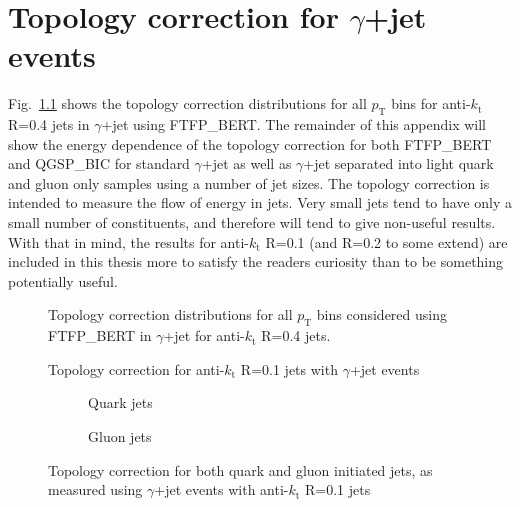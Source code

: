 \chapter{ Topology correction for $\gamma$+jet events}
Fig.~\ref{plot:GJetTopoCorrDists4App} shows the topology correction distributions for all $p_{\mathrm T}$ bins for anti-$k_{\mathrm t}$ R=0.4 jets in $\gamma$+jet using FTFP\_BERT.  
The remainder of this appendix will show the energy dependence of the topology correction for both FTFP\_BERT and QGSP\_BIC for standard $\gamma$+jet as well as $\gamma$+jet separated into light quark and gluon only samples using a number of jet sizes.  
The topology correction is intended to measure the flow of energy in jets.  
Very small jets tend to have only a small number of constituents, and therefore will tend to give non-useful results.  
With that in mind, the results for anti-$k_{\mathrm t}$ R=0.1 (and R=0.2 to some extend) are included in this thesis more to satisfy the readers curiosity than to be something potentially useful. 


\begin{figure}[!ht]
 \centering
 \caption[Topology correction distributions, anti-$k_{\mathrm t}$ R=0.4 with FTFP\_BERT]
 {\small Topology correction distributions for all $p_{\mathrm T}$ bins considered using FTFP\_BERT in $\gamma$+jet for anti-$k_{\mathrm t}$ R=0.4 jets.  } 
 \label{plot:GJetTopoCorrDists4App}
\end{figure}
\clearpage

\begin{figure}[!ht]
 \centering
 \caption[Topology correction for anti-$k_{\mathrm t}$ R=0.1 jets with $\gamma$+jet events]
 {\small Topology correction for anti-$k_{\mathrm t}$ R=0.1 jets with $\gamma$+jet events}
 \label{plot:GJetTopoCorr1App}
\end{figure}

\begin{figure}[!ht]
 \centering
 \begin{subfigure}{.5\textwidth}
  \centering
  \caption{Quark jets}
 \end{subfigure}%
 \begin{subfigure}{.5\textwidth}
  \centering
  \caption{Gluon jets}
 \end{subfigure}
 \caption[Quark/gluon jet topology correction, anti-$k_{\mathrm t}$ R=0.1, $\gamma$+jet]
 {\small Topology correction for both quark and gluon initiated jets, as measured using $\gamma$+jet events with anti-$k_{\mathrm t}$ R=0.1 jets}
 \label{plot:GJetTopoCorrFlav1App}
\end{figure}

